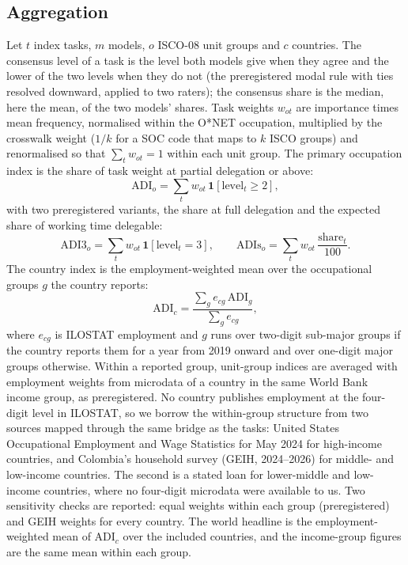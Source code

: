 \subsection{Aggregation}

Let $t$ index tasks, $m$ models, $o$ ISCO-08 unit groups and $c$ countries.
The consensus level of a task is the level both models give when they agree and the lower of the two levels when they do not (the preregistered modal rule with ties resolved downward, applied to two raters); the consensus share is the median, here the mean, of the two models' shares.
Task weights $w_{ot}$ are importance times mean frequency, normalised within the O*NET occupation, multiplied by the crosswalk weight ($1/k$ for a SOC code that maps to $k$ ISCO groups) and renormalised so that $\sum_t w_{ot} = 1$ within each unit group.
The primary occupation index is the share of task weight at partial delegation or above:
\begin{equation}
  \mathrm{ADI}_o = \sum_{t} w_{ot}\, \mathbf{1}[\mathrm{level}_t \geq 2],
  \label{eq:adi_o}
\end{equation}
with two preregistered variants, the share at full delegation and the expected share of working time delegable:
\begin{equation}
  \mathrm{ADI3}_o = \sum_{t} w_{ot}\, \mathbf{1}[\mathrm{level}_t = 3], \qquad
  \mathrm{ADIs}_o = \sum_{t} w_{ot}\, \frac{\mathrm{share}_t}{100}.
  \label{eq:adi_var}
\end{equation}
The country index is the employment-weighted mean over the occupational groups $g$ the country reports:
\begin{equation}
  \mathrm{ADI}_c = \frac{\sum_{g} e_{cg}\, \mathrm{ADI}_g}{\sum_{g} e_{cg}},
  \label{eq:adi_c}
\end{equation}
where $e_{cg}$ is ILOSTAT employment and $g$ runs over two-digit sub-major groups if the country reports them for a year from 2019 onward and over one-digit major groups otherwise.
Within a reported group, unit-group indices are averaged with employment weights from microdata of a country in the same World Bank income group, as preregistered. No country publishes employment at the four-digit level in ILOSTAT, so we borrow the within-group structure from two sources mapped through the same bridge as the tasks: United States Occupational Employment and Wage Statistics for May 2024 \citep{bls2025oes} for high-income countries, and Colombia's household survey (GEIH, 2024--2026) \citep{dane2026geih} for middle- and low-income countries. The second is a stated loan for lower-middle and low-income countries, where no four-digit microdata were available to us. Two sensitivity checks are reported: equal weights within each group (preregistered) and GEIH weights for every country.
The world headline is the employment-weighted mean of $\mathrm{ADI}_c$ over the  included countries, and the income-group figures are the same mean within each group.

